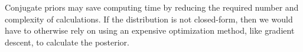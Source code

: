 Conjugate priors may save computing time by reducing the required number and complexity of calculations. If the distribution is not closed-form, then we would have to otherwise rely on using an expensive optimization method, like gradient descent, to calculate the posterior.